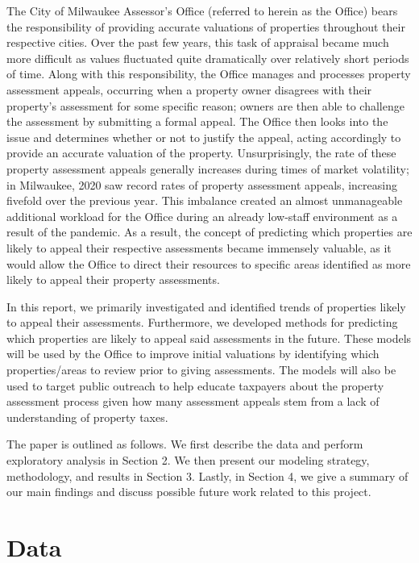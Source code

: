 \documentclass[
  12pt,
]{article}
\begin{document}
The City of Milwaukee Assessor's Office (referred to herein as the Office)
bears the responsibility of providing accurate valuations of properties
throughout their respective cities. Over the past few years, this task
of appraisal became much more difficult as values fluctuated quite
dramatically over relatively short periods of time. Along with this
responsibility, the Office manages and processes property assessment
appeals, occurring when a property owner disagrees with their property's
assessment for some specific reason; owners are then able to challenge
the assessment by submitting a formal appeal. The Office then looks into
the issue and determines whether or not to justify the appeal, acting
accordingly to provide an accurate valuation of the property.
Unsurprisingly, the rate of these property assessment appeals generally
increases during times of market volatility; in Milwaukee, 2020 saw
record rates of property assessment appeals, increasing fivefold over
the previous year. This imbalance created an almost unmanageable
additional workload for the Office during an already low-staff
environment as a result of the pandemic. As a result, the concept of
predicting which properties are likely to appeal their respective
assessments became immensely valuable, as it would allow the Office to
direct their resources to specific areas identified as more likely to
appeal their property assessments.

In this report, we primarily investigated and identified trends of
properties likely to appeal their assessments. Furthermore, we developed
methods for predicting which properties are likely to appeal said
assessments in the future. These models will be used by the Office to
improve initial valuations by identifying which properties/areas to
review prior to giving assessments. The models will also be used to
target public outreach to help educate taxpayers about the property
assessment process given how many assessment appeals stem from a lack of
understanding of property taxes.

The paper is outlined as follows. We first describe the data and perform
exploratory analysis in Section 2. We then present our modeling
strategy, methodology, and results in Section 3. Lastly, in Section 4,
we give a summary of our main findings and discuss possible future work
related to this project.

\hypertarget{data}{%
\section{Data}\label{data}}
\end{document}

